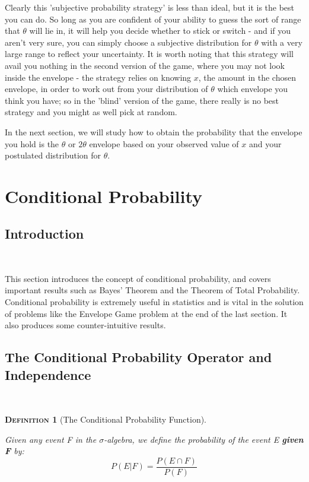 \documentclass[12pt,a4paper]{article}
\newtheorem{definition}{\textsc{Definition}}[section]
\begin{document}
Clearly this 'subjective probability strategy' is less than ideal, but it is the best you can do. So long as you are confident of your ability to guess the sort of range that $\theta$ will lie in, it will help you decide whether to stick or switch - and if you aren't very sure, you can simply choose a subjective distribution for $\theta$ with a very large range to reflect your uncertainty. It is worth noting that this strategy will avail you nothing in the second version of the game, where you may not look inside the envelope - the strategy relies on knowing $x$, the amount in the chosen envelope, in order to work out from your distribution of $\theta$ which envelope you think you have; so in the 'blind' version of the game, there really is no best strategy and you might as well pick at random.

In the next section, we will study how to obtain the probability that the envelope you hold is the $\theta$ or $2\theta$ envelope based on your observed value of $x$ and your postulated distribution for $\theta$.

\clearpage
\section{Conditional Probability}

\subsection{Introduction}$\;$

This section introduces the concept of conditional probability, and covers important results such as Bayes' Theorem and the Theorem of Total Probability. Conditional probability is extremely useful in statistics and is vital in the solution of problems like the Envelope Game problem at the end of the last section. It also produces some counter-intuitive results.

\subsection{The Conditional Probability Operator and Independence}\label{conditional and independence}$\;$
\begin{definition}[The Conditional Probability Function]$\;$\par
\vspace{12pt}

Given any event F in the $\sigma$-algebra, we define the probability of the event E {\bf given F} by:
$$P(E|F) = \frac{P(E \cap F)}{P(F)}$$
\end{definition}
\end{document}
